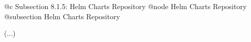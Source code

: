 @c Subsection 8.1.5: Helm Charts Repository
@node Helm Charts Repository
@subsection Helm Charts Repository

(...)
